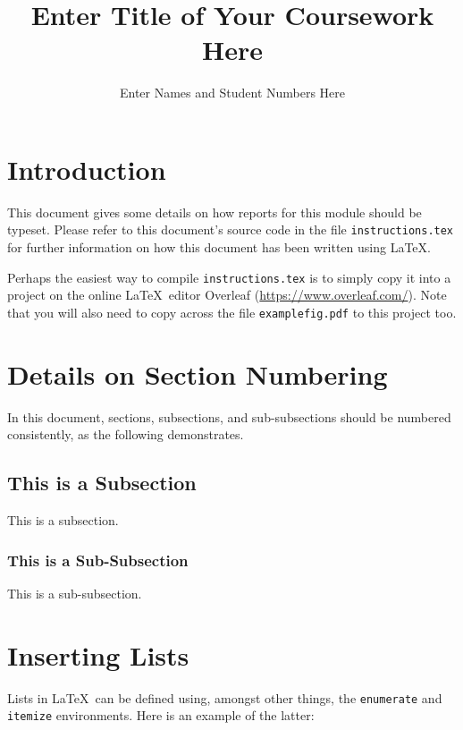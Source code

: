 \documentclass[10pt]{article}
\title{Enter Title of Your Coursework Here}
\author{Enter Names and Student Numbers Here}
\affil{
	MA2760: Mathematical Investigations with Python\\
	School of Mathematics, \\
	Cardiff University. 
}
\begin{document}
\maketitle


\section{Introduction}

This document gives some details on how reports for this module should be typeset. Please refer to this document's source code in the file \texttt{instructions.tex} for further information on how this document has been written using \LaTeX. 

Perhaps the easiest way to compile \texttt{instructions.tex} is to simply copy it into a project on the online \LaTeX\ editor Overleaf (\url{https://www.overleaf.com/}). Note that you will also need to copy across the file \texttt{examplefig.pdf} to this project too. 


\section{Details on Section Numbering}

In this document, sections, subsections, and sub-subsections should be numbered consistently, as the following demonstrates.

\subsection{This is a Subsection}

This is a subsection.

\subsubsection{This is a Sub-Subsection}

This is a sub-subsection.


\section{Inserting Lists}

Lists in \LaTeX\ can be defined using, amongst other things, the \texttt{enumerate} and \texttt{itemize} environments. Here is an example of the latter:
\end{document}
